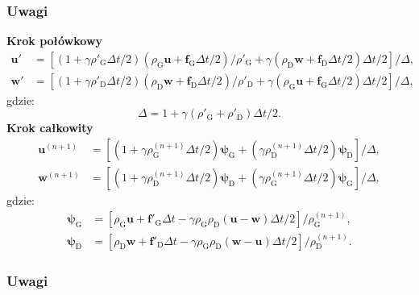 \documentclass{beamer}
\begin{document}
\begin{frame}
\frametitle{Uwagi}
{\scriptsize
\textbf{Krok połówkowy}
\begin{align}
\mathbf{u}' &= 
\left[
   \left(1 + \gamma\rho'_{\textrm{G}}\Delta t / 2 \right)
   \left(\rho_{\textrm{G}}\mathbf{u} + \mathbf{f}_{\textrm{G}} \Delta t / 2 \right) / \rho'_{\textrm{G}}
   +\gamma \left( \rho_{\textrm{D}}\mathbf{w} + \mathbf{f}_{\textrm{D}}\Delta t / 2 \right) \Delta t / 2
\right] / \Delta, \\
\mathbf{w}' &= 
\left[
   \left(1 + \gamma\rho'_{\textrm{D}}\Delta t / 2 \right)
   \left(\rho_{\textrm{D}}\mathbf{w} + \mathbf{f}_{\textrm{D}} \Delta t / 2 \right) / \rho'_{\textrm{D}}
   +\gamma \left( \rho_{\textrm{G}}\mathbf{u} + \mathbf{f}_{\textrm{G}}\Delta t / 2 \right) \Delta t / 2
\right] / \Delta,
\end{align}
gdzie:
\begin{equation}
\Delta = 1 + \gamma(\rho'_{\textrm{G}} + \rho'_{\textrm{D}})\Delta t / 2.
\end{equation}
\textbf{Krok całkowity}
\begin{align}
\mathbf{u}^{(n+1)} &=
\left[ 
  \left(1 + \gamma \rho_{\textrm{G}}^{(n+1)} \Delta t / 2 \right)\mathbf{\psi}_{\textrm{G}} +
       \left(\gamma \rho_{\textrm{D}}^{(n+1)} \Delta t / 2 \right)\mathbf{\psi}_{\textrm{D}}
\right] / \Delta,  \\
\mathbf{w}^{(n+1)} &= 
\left[ 
  \left(1 + \gamma \rho_{\textrm{D}}^{(n+1)} \Delta t / 2\right)\mathbf{\psi}_{\textrm{D}} +
  \left(  \gamma \rho_{\textrm{G}}^{(n+1)} \Delta t / 2\right) \mathbf{\psi}_{\textrm{G}}
\right] / \Delta,
\end{align}
gdzie:
\begin{align}
\mathbf{\psi}_{\textrm{G}} & = 
\left[
  \rho_{\textrm{G}} \mathbf{u} + \mathbf{f}'_{\textrm{G}}\Delta t - \gamma \rho_{\textrm{G}} \rho_{\textrm{D}} (\mathbf{u} - \mathbf{w}) \Delta t / 2
\right] / {\rho_{\textrm{G}}^{(n+1)}},  \\
\mathbf{\psi}_{\textrm{D}} & = 
\left[
  \rho_{\textrm{D}} \mathbf{w} + \mathbf{f}'_{\textrm{D}}\Delta t - \gamma \rho_{\textrm{G}} \rho_{\textrm{D}} (\mathbf{w} - \mathbf{u}) \Delta t / 2
\right] / {\rho_{\textrm{D}}^{(n+1)}}.
\end{align}
}
\end{frame}

\begin{frame}
\frametitle{Uwagi}
\begin{columns}
   \begin{column}{0.5\textwidth}
      \begin{center}
      \end{center}
   \end{column}
   \begin{column}{0.5\textwidth}
      \begin{center}
      \end{center}
   \end{column}
\end{columns}
\end{frame}
\end{document}
